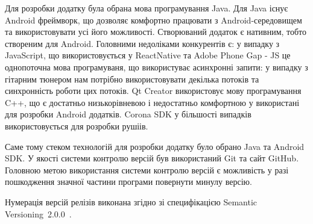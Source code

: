 Для розробки додатку була обрана мова програмування Java. Для Java існує Android фреймворк, що дозволяє комфортно працювати з Android-середовищем та використовувати усі його можливості. Створюваний додаток є нативним, тобто створеним для Android. Головними недоліками конкурентів є: у випадку з JavaScript, що використовується у ReactNative та Adobe Phone Gap - JS це однопоточна мова програмуваня, що використуває асинхронні запити: у випадку з гітарним тюнером нам потрібно використовувати декілька потоків та синхронність роботи цих потоків. Qt Creator використовує мову програмування C++, що є достатньо низькорівневою і недостатньо комфортною у використані для розробки Android додатків. Corona SDK у більшості випадків використовується для розробки рушіів. 

Саме тому стеком технологій для розробки додатку було обрано Java та Android SDK. У якості системи контролю версій був використаний Git та сайт GitHub. Головною метою використання системи контролю версій є можливість у разі пошкодження значної частини програми повернути минулу версію.

Нумерація версій релізів виконана згідно зі специфікацією Semantic Versioning~2.0.0~\cite{semver}.